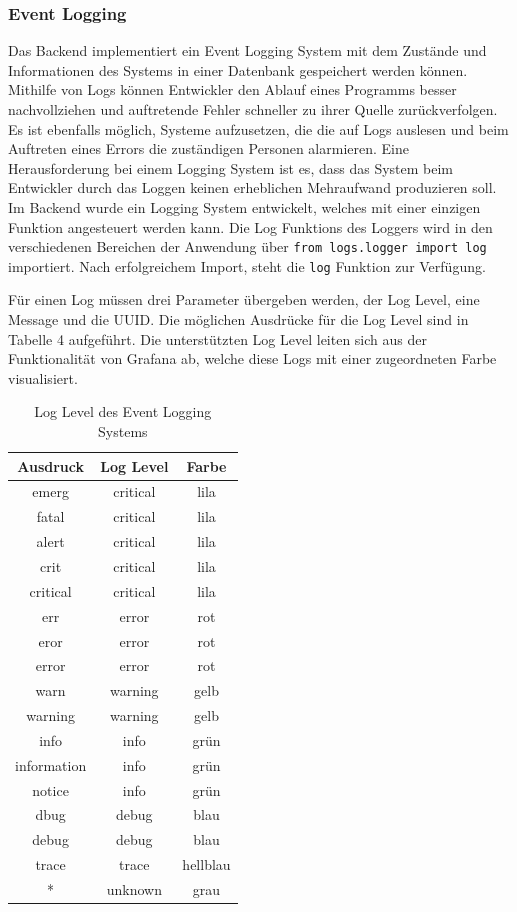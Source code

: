 \subsubsection{Event Logging}
Das Backend implementiert ein Event Logging System mit dem Zustände und Informationen des Systems in einer Datenbank gespeichert werden können. Mithilfe von Logs können Entwickler den Ablauf eines Programms besser nachvollziehen und auftretende Fehler schneller zu ihrer Quelle zurückverfolgen. Es ist ebenfalls möglich, Systeme aufzusetzen, die die auf Logs auslesen und beim Auftreten eines Errors die zuständigen Personen alarmieren. Eine Herausforderung bei einem Logging System ist es, dass das System beim Entwickler durch das Loggen keinen erheblichen Mehraufwand produzieren soll. Im Backend wurde ein Logging System entwickelt, welches mit einer einzigen Funktion angesteuert werden kann. Die Log Funktions des Loggers wird in den verschiedenen Bereichen der Anwendung über \texttt{from logs.logger import log} importiert. Nach erfolgreichem Import, steht die \texttt{log} Funktion zur Verfügung. 

Für einen Log müssen drei Parameter übergeben werden, der Log Level, eine Message und die UUID. Die möglichen Ausdrücke für die Log Level sind in Tabelle 4 aufgeführt. Die unterstützten Log Level leiten sich aus der Funktionalität von Grafana ab, welche diese Logs mit einer zugeordneten Farbe visualisiert.

\begin{table}[H]
\centering
\begin{tabular}{c|c|c}
\textbf{Ausdruck} & \textbf{Log Level} & \textbf{Farbe}\\
\hline
emerg & critical & lila\\
fatal & critical & lila\\
alert & critical & lila\\
crit & critical & lila\\
critical & critical & lila\\
err & error & rot\\
eror & error & rot\\
error & error & rot\\
warn & warning & gelb\\
warning & warning & gelb\\
info & info & grün\\
information & info & grün\\
notice & info & grün\\
dbug & debug & blau\\
debug & debug & blau\\
trace & trace & hellblau\\
* & unknown & grau
\end{tabular}
\caption{Log Level des Event Logging Systems}
\end{table}

